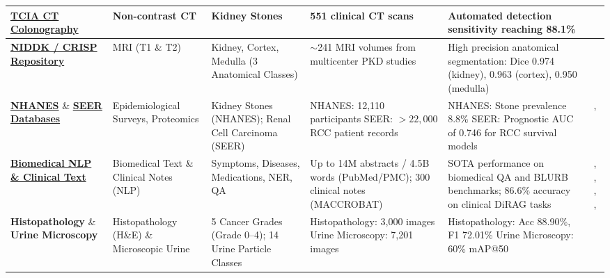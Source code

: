 \documentclass[pdflatex,sn-mathphys-num]{sn-jnl}%
\begin{document}
\begin{longtable}{|L{2.2cm}|L{1.3cm}|L{1.6cm}|L{2.2cm}|L{2.8cm}|L{1.7cm}|}
\hline
\textbf{\href{https://www.cancerimagingarchive.net/collection/ct-colonography/}{TCIA CT Colonography}} & Non-contrast CT & Kidney Stones & 551 clinical CT scans & Automated detection sensitivity reaching 88.1\% & \cite{elton2022deep} \\
\hline
\textbf{\href{https://www.niddkrepository.org/studies/crisp/}{NIDDK / CRISP Repository}} & MRI (T1 \& T2) & Kidney, Cortex, Medulla (3 Anatomical Classes) & $\sim$241 MRI volumes from multicenter PKD studies & High precision anatomical segmentation: Dice 0.974 (kidney), 0.963 (cortex), 0.950 (medulla) & \cite{raj2022deep} \\
\hline
\textbf{\href{https://www.cdc.gov/nchs/nhanes/index.htm}{NHANES}} \& \textbf{\href{https://seer.cancer.gov/}{SEER Databases}} & Epidemiological Surveys, Proteomics & Kidney Stones (NHANES); Renal Cell Carcinoma (SEER) & NHANES: 12,110 participants \newline SEER: $>22,000$ RCC patient records & NHANES: Stone prevalence 8.8\% \newline SEER: Prognostic AUC of 0.746 for RCC survival models & \cite{scales2012prevalence}, \cite{wang2022survival} \\
\hline
\textbf{\href{https://huggingface.co/datasets/ncbi/pubmed}{Biomedical NLP \& Clinical Text}} & Biomedical Text \& Clinical Notes (NLP) & Symptoms, Diseases, Medications, NER, QA & Up to 14M abstracts / 4.5B words (PubMed/PMC); 300 clinical notes (MACCROBAT) & SOTA performance on biomedical QA and BLURB benchmarks; 86.6\% accuracy on clinical DiRAG tasks & \cite{lee2020biobert}, \cite{fang2023bioformer}, \cite{luo2022biogpt}, \cite{gu2021domain}, \cite{sreenivas2025enhancing} \\
\hline
\textbf{Histopathology} \& \textbf{Urine Microscopy} & Histopathology (H\&E) \& Microscopic Urine & 5 Cancer Grades (Grade 0–4); 14 Urine Particle Classes & Histopathology: 3,000 images \newline Urine Microscopy: 7,201 images & Histopathology: Acc 88.90\%, F1 72.01\% \newline Urine Microscopy: 60\% mAP@50 & \cite{akhtar2026yolov11} \\
\hline



\end{longtable}
\end{document}
